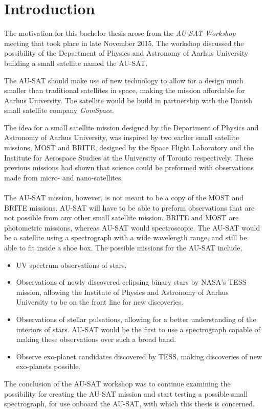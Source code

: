 \chapter{Introduction}

The motivation for this bachelor thesis arose from the \emph{AU-SAT Workshop} meeting that took place in late November 2015. The workshop discussed the possibility of the Department of Physics and Astronomy of Aarhus University building a small satellite named the AU-SAT. 

The AU-SAT should make use of new technology to allow for a design much smaller than traditional satellites in space, making the mission affordable for Aarhus University. The satellite would be build in partnership with the Danish small satellite company \emph{GomSpace}.

The idea for a small satellite mission designed by the Department of Physics and Astronomy of Aarhus University, was inspired by two earlier small satellite missions, MOST and BRITE, designed by the Space Flight Laboratory and the Institute for Aerospace Studies at the University of Toronto respectively. These previous missions had shown that science could be preformed with observations made from micro- and nano-satellites.
\\
\\
The AU-SAT mission, however, is not meant to be a copy of the MOST and BRITE missions. AU-SAT will have to be able to preform observations that are not possible from any other small satellite mission. BRITE and MOST are photometric missions, whereas AU-SAT would spectroscopic. The AU-SAT would be a satellite using a spectrograph with a wide wavelength range, and still be able to fit inside a shoe box.
The possible missions for the AU-SAT include,

\begin{itemize}
\item UV spectrum observations of stars.
\item Observations of newly discovered eclipsing binary stars by NASA's TESS mission, allowing the Institute of Physics and Astronomy of Aarhus University to be on the front line for new discoveries.
\item Observations of stellar pulsations, allowing for a better understanding of the interiors of stars. AU-SAT would be the first to use a spectrograph capable of making these observations over such a broad band. 
\item Observe exo-planet candidates discovered by TESS, making discoveries of new exo-planets possible.
\end{itemize}

The conclusion of the AU-SAT workshop was to continue examining the possibility for creating the AU-SAT mission and start testing a possible small spectrograph, for use onboard the AU-SAT, with which this thesis is concerned. 

